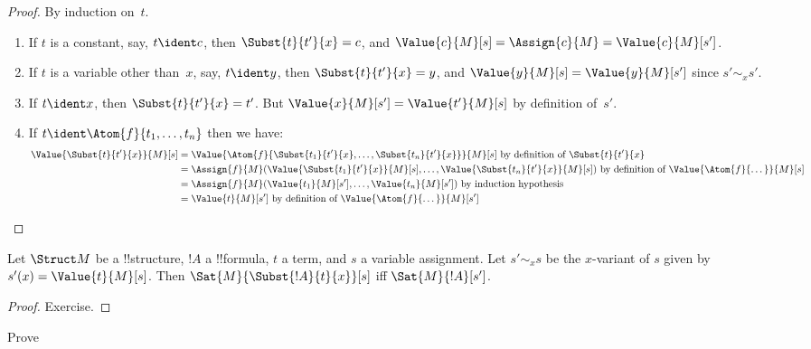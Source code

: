 \documentclass[../../include/open-logic-section]{subfiles}
\begin{document}
\begin{proof}
By induction on~$t$. 
\begin{enumerate}
\item If $t$ is a constant, say, $t\ident c$, then $\Subst{t}{t'}{x} =
  c$, and $\Value{c}{M}[s] = \Assign{c}{M} = \Value{c}{M}[s']$.

\item If $t$ is a variable other than~$x$, say, $t \ident y$, then
  $\Subst{t}{t'}{x} = y$, and $\Value{y}{M}[s] = \Value{y}{M}[s']$
  since $s' \sim_x s'$.

\item If $t \ident x$, then $\Subst{t}{t'}{x} = t'$.  But
  $\Value{x}{M}[s'] = \Value{t'}{M}[s]$ by definition of~$s'$.

\item If $t \ident \Atom{f}{t_1,\dots,t_n}$ then we have:
\begin{align*}
\Value{\Subst{t}{t'}{x}}{M}[s] & = 
\Value{\Atom{f}{\Subst{t_1}{t'}{x}, \dots, \Subst{t_n}{t'}{x}}}{M}[s]
    \text{ by definition of $\Subst{t}{t'}{x}$}\\
& = \Assign{f}{M}(\Value{\Subst{t_1}{t'}{x}}{M}[s], \dots, 
   \Value{\Subst{t_n}{t'}{x}}{M}[s]) 
    \text{ by definition of $\Value{\Atom{f}{\dots}}{M}[s]$}\\
& = \Assign{f}{M}(\Value{t_1}{M}[s'], \dots, 
   \Value{t_n}{M}[s']) 
    \text{ by induction hypothesis}\\
& = \Value{t}{M}[s']
    \text{ by definition of $\Value{\Atom{f}{\dots}}{M}[s']$}
\end{align*}
\end{enumerate}
\end{proof}

\begin{prop}
Let $\Struct M$ be a !!{structure}, $!A$ a !!{formula}, $t$ a term,
and $s$ a variable assignment. Let $s' \sim_x s$ be the $x$-variant of
$s$ given by~$s'(x) = \Value{t}{M}[s]$. Then
$\Sat{M}{\Subst{!A}{t}{x}}[s]$ iff $\Sat{M}{!A}[s']$.
\end{prop}

\begin{proof}
Exercise.
\end{proof}

\begin{prob}
Prove 
\end{prob}
\end{document}
